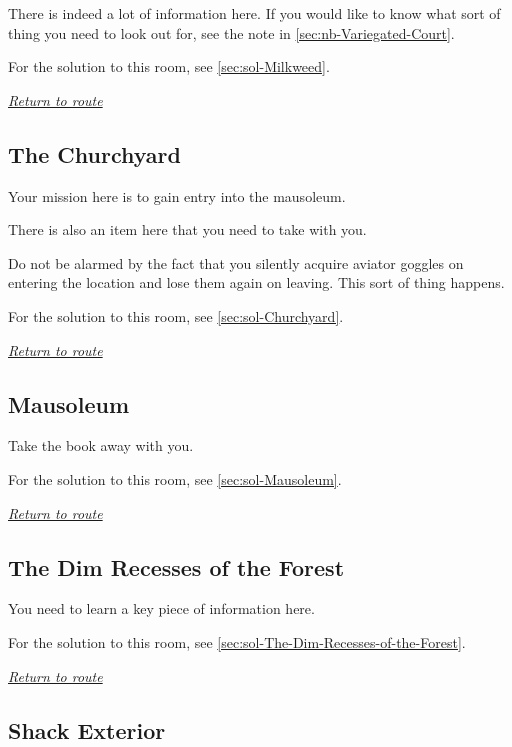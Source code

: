 \documentclass[a5paper]{extarticle}
\begin{document}
There is indeed a lot of information here.
If you would like to know what sort of thing you need to look out for,
see the note in \cref{sec:nb-Variegated-Court}.

For the solution to this room, see \cref{sec:sol-Milkweed}.

\hyperref[sec:route]{\emph{Return to route}}

\newpage
\subsection{The Churchyard}\label{sec:req-Churchyard}

Your mission here is to gain entry into the mausoleum.

There is also an item here that you need to take with you.

Do not be alarmed by the fact that you silently acquire aviator goggles
on entering the location and lose them again on leaving. This sort of thing
happens.

For the solution to this room, see \cref{sec:sol-Churchyard}.

\hyperref[sec:route]{\emph{Return to route}}

\newpage
\subsection{Mausoleum}\label{sec:req-Mausoleum}

Take the book away with you.

For the solution to this room, see \cref{sec:sol-Mausoleum}.

\hyperref[sec:route]{\emph{Return to route}}

\newpage
\subsection{The Dim Recesses of the Forest}\label{sec:req-The-Dim-Recesses-of-the-Forest}

You need to learn a key piece of information here.

For the solution to this room, see \cref{sec:sol-The-Dim-Recesses-of-the-Forest}.

\hyperref[sec:route-1]{\emph{Return to route}}

\newpage
\subsection{Shack Exterior}\label{sec:req-Shack-Exterior-0}
\end{document}

